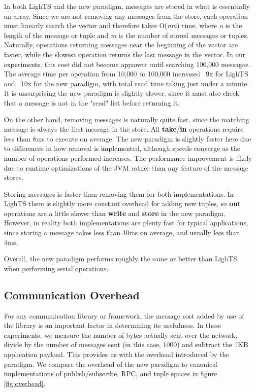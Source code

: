 \documentclass[lnicst]{svmultln}
\begin{document}
In both LighTS and the new paradigm, messages are stored in what is essentially an array. Since we are not removing any messages from the store, each operation must linearly search the vector and therefore takes O(\textit{nm}) time, where \textit{n} is the length of the message or tuple and \textit{m} is the number of stored messages or tuples. Naturally, operations returning messages near the beginning of the vector are faster, while the slowest operation returns the last message in the vector. In our experiments, this cost did not become apparent until searching 100,000 messages. The average time per operation from 10,000 to 100,000 increased ~9x for LighTS and ~10x for the new paradigm, with total read time taking just under a minute. It is unsurprising the new paradigm is slightly slower, since it must also check that a message is not in the "read" list before returning it.

On the other hand, removing messages is naturally quite fast, since the matching message is always the first message in the store. All \textbf{take}/\textbf{in} operations require less than 8ms to execute on average. The new paradigm is slightly faster here due to differences in how removal is implemented, although speeds converge as the number of operations performed increases. The performance improvement is likely due to runtime optimizations of the JVM rather than any feature of the message stores.

Storing messages is faster than removing them for both implementations. In LighTS there is slightly more constant overhead for adding new tuples, so \textbf{out} operations are a little slower than \textbf{write} and \textbf{store} in the new paradigm.  However, in reality both implementations are plenty fast for typical applications, since storing a message takes less than 10ms on average, and usually less than 4ms.

Overall, the new paradigm performs roughly the same or better than LighTS when performing serial operations.

\subsection{Communication Overhead}

For any communication library or framework, the message cost added by use of the library is an important factor in determining its usefulness. In these experiments, we measure the number of bytes actually sent over the network, divide by the number of messages sent (in this case, 1000) and subtract the 1KB application payload. This provides us with the overhead introduced by the paradigm. We compare the overhead of the new paradigm to canonical implementations of publish/subscribe, RPC, and tuple spaces in figure \ref{fig:overhead}.
\end{document}
